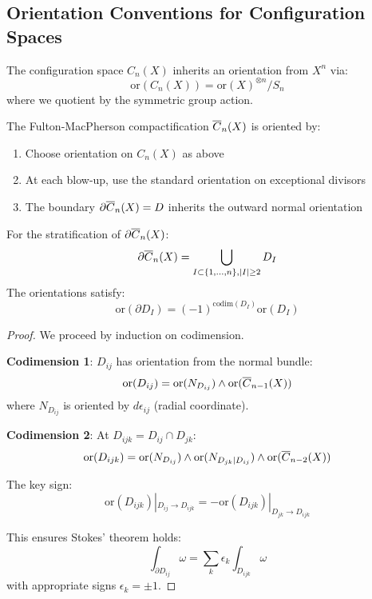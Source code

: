 \subsection{Orientation Conventions for Configuration Spaces}

\begin{definition}
The configuration space $C_n(X)$ inherits an orientation from $X^n$ via:
$$\text{or}(C_n(X)) = \text{or}(X)^{\otimes n} / S_n$$
where we quotient by the symmetric group action.
\end{definition}

\begin{definition}
The Fulton-MacPherson compactification $\overline{C}_{n}(X)$ is oriented by:
\begin{enumerate}
\item Choose orientation on $C_n(X)$ as above
\item At each blow-up, use the standard orientation on exceptional divisors
\item The boundary $\partial\overline{C}_{n}(X) = D$ inherits the outward normal orientation
\end{enumerate}
\end{definition}

\begin{lemma}
For the stratification of $\partial\overline{C}_{n}(X)$:
$$\partial\overline{C}_{n}(X) = \bigcup_{I \subset \{1,\ldots,n\}, |I| \geq 2} D_I$$
The orientations satisfy:
$$\text{or}(\partial D_I) = (-1)^{\text{codim}(D_I)} \text{or}(D_I)$$
\end{lemma}

\begin{proof}
We proceed by induction on codimension.

\textbf{Codimension 1}: $D_{ij}$ has orientation from the normal bundle:
$$\text{or}(D_{ij}) = \text{or}(N_{D_{ij}}) \wedge \text{or}(\overline{C}_{n-1}(X))$$
where $N_{D_{ij}}$ is oriented by $d\epsilon_{ij}$ (radial coordinate).

\textbf{Codimension 2}: At $D_{ijk} = D_{ij} \cap D_{jk}$:
$$\text{or}(D_{ijk}) = \text{or}(N_{D_{ij}}) \wedge \text{or}(N_{D_{jk}|D_{ij}}) \wedge \text{or}(\overline{C}_{n-2}(X))$$

The key sign:
$$\text{or}(D_{ijk})|_{D_{ij} \to D_{ijk}} = -\text{or}(D_{ijk})|_{D_{jk} \to D_{ijk}}$$

This ensures Stokes' theorem holds:
$$\int_{\partial D_{ij}} \omega = \sum_{k} \epsilon_k \int_{D_{ijk}} \omega$$
with appropriate signs $\epsilon_k = \pm 1$.
\end{proof}

